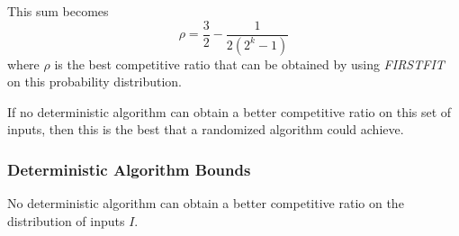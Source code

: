 This sum becomes
\begin{equation*}
\rho = \frac{3}{2} - \frac{1}{2(2^k-1)}
\end{equation*}
%
where $\rho$ is the best competitive ratio that can be obtained by using \emph{FIRSTFIT} on this probability distribution. 

If no deterministic algorithm can obtain a better competitive ratio on this set of inputs, then this is the best that a randomized algorithm could achieve.
\subsubsection{Deterministic Algorithm Bounds}
\begin{theorem}
	No deterministic algorithm can obtain a better competitive ratio on the distribution of inputs $I$.
\end{theorem}
